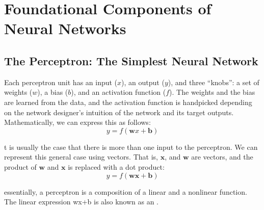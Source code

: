 \chapter{Foundational Components of Neural Networks\label{Ch03}}
\section{The Perceptron: The Simplest Neural Network}
Each perceptron unit has an input ($x$), an output ($y$), and three “knobs”: a set of
weights ($w$), a bias ($b$), and an activation function ($f$). The weights and the bias are
learned from the data, and the activation function is handpicked depending on the
network designer’s intuition of the network and its target outputs. Mathematically,
we can express this as follows:
$$y = f(\textbf{w}x + \textbf{b})$$


t is usually the case that there is more than one input to the perceptron. We can represent this general case using vectors. That is, $\textbf{x}$, and $\textbf{w}$ are vectors, and the product of $\textbf{w}$ and $\textbf{x}$ is replaced with a dot product:
$$y = f(\textbf{w}\textbf{x} + \textbf{b})$$

essentially, a perceptron is a composition of a linear and a nonlinear function. The linear expression wx+b is also known as an .